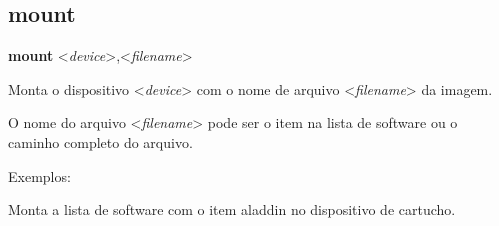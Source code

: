 \documentclass[letterpaper,10pt,brazil]{sphinxmanual}
\begin{document}
\subsection{mount}
\label{debugger/image:mount}\label{debugger/image:debugger-command-mount}
\begin{DUlineblock}{0em}
\item[]
\begin{DUlineblock}{\DUlineblockindent}
\item[] \textbf{mount} \textless{}\emph{device}\textgreater{},\textless{}\emph{filename}\textgreater{}
\item[] 
\end{DUlineblock}
\item[] Monta o dispositivo \textless{}\emph{device}\textgreater{} com o nome de arquivo \textless{}\emph{filename}\textgreater{} da imagem.
\item[] 
\item[] O nome do arquivo \textless{}\emph{filename}\textgreater{} pode ser o item na lista de software ou o caminho completo do arquivo.
\item[] 
\item[] Exemplos:
\item[] 
\item[]
\begin{DUlineblock}{\DUlineblockindent}
\item[] 
\item[] 
\end{DUlineblock}
\item[] Monta a lista de software com o item aladdin no dispositivo de cartucho.
\end{DUlineblock}
\begin{quote}
\label{debugger/image:debugger-command-unmount}\end{quote}
\end{document}
